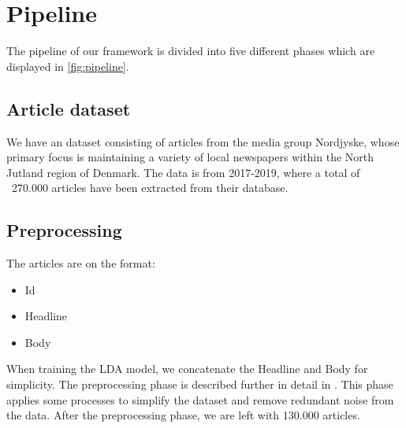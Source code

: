 \section{Pipeline}


The pipeline of our framework is divided into five different phases which are displayed in \autoref{fig:pipeline}.

\subsection{Article dataset}
We have an dataset consisting of articles from the media group Nordjyske, whose primary focus is maintaining a variety of local newspapers within the North Jutland region of Denmark. 
The data is from 2017-2019, where a total of ~270.000 articles have been extracted from their database.

\subsection{Preprocessing}
The articles are on the format:
\begin{itemize}
	\item Id
	\item Headline
	\item Body
\end{itemize}
When training the LDA model, we concatenate the Headline and Body for simplicity.
The preprocessing phase is described further in detail in .
This phase applies some processes to simplify the dataset and remove redundant noise from the data. 
After the preprocessing phase, we are left with 130.000 articles.
